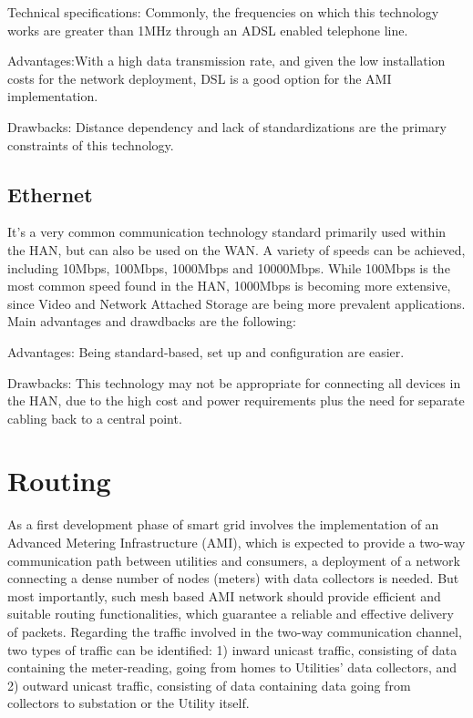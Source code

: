 \documentclass[11pt,final,onecolumn]{IEEEtran}
\begin{document}
Technical specifications: Commonly, the frequencies on which this technology works are greater than 1MHz through an ADSL enabled telephone line. 

Advantages:With a high data transmission rate, and given the low installation costs for the network deployment, DSL is a good option for the AMI implementation.

Drawbacks: Distance dependency and lack of standardizations are the primary constraints of this technology.


\subsection{Ethernet}\label{ethernetl}

It’s a very common communication technology standard primarily used within the HAN, but can also be used on the WAN. A variety of speeds can be achieved, including 10Mbps, 100Mbps, 1000Mbps and 10000Mbps. While 100Mbps is the most common speed found in the HAN, 1000Mbps is becoming more extensive, since Video and Network Attached Storage are being more prevalent applications. Main advantages and drawdbacks are the following:

Advantages: Being standard-based, set up and configuration are easier.

Drawbacks: This technology may not be appropriate for connecting all devices in the HAN, due to the high cost and power requirements plus the need for separate cabling back to a central point.


\section{Routing} \label{routing}

As a first development phase of smart grid involves the implementation of an Advanced Metering Infrastructure (AMI), which is expected to provide a two-way communication path between utilities and consumers, a deployment of a network connecting a dense number of nodes (meters) with data collectors is needed. But most importantly, such mesh based AMI network should provide efficient and suitable routing functionalities, which guarantee a reliable and effective delivery of packets. Regarding the traffic involved in the two-way communication channel, two types of traffic can be identified: 1) inward unicast traffic, consisting of data containing the meter-reading, going from homes to Utilities’ data collectors, and 2) outward unicast traffic, consisting of data containing data going from collectors to substation or the Utility itself. 
\end{document}
